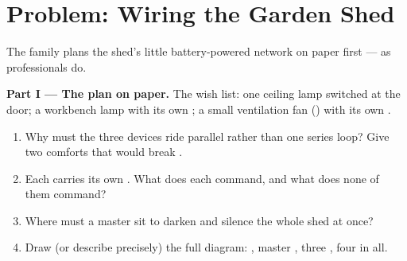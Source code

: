 \section{Problem: Wiring the Garden Shed}

\begin{problem}\label{pb:g6:circuits-and-safety:1}
The family plans the shed's little battery-powered network on
paper first --- as professionals do.

\medskip\noindent\textbf{Part I --- The plan on paper.}
The wish list: one ceiling lamp switched at the door; a workbench
lamp with its own ; a small ventilation fan () with its
own .
\begin{enumerate}
  \item Why must the three devices ride parallel  rather
        than one series loop? Give two comforts that would break
        .
  \item Each  carries its own . What does each 
        command, and what does none of them command?
  \item Where must a master  sit to darken and silence the
        whole shed at once?
  \item Draw (or describe precisely) the full diagram: ,
        master , three , four  in all.
\end{enumerate}


\end{problem}
